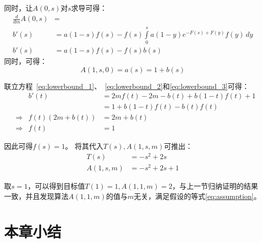 同时，让$A(0, s)$对$s$求导可得：
\begin{align}
    \nonumber \frac{d}{dm}A(0,s) & = \\ 
    \nonumber  b'(s) & = a(1-s)f(s) - f(s)\int\limits_{0}^{s} a{\left(1 - y \right)} e^{- F{\left(s \right)} + F{\left(y \right)}} f(y)\, dy\\
    b'(s) & = a(1-s)f(s) - f(s)b(s) \label{eq:lowerbound_2}
\end{align}
同时，可得：
\begin{equation} \label{eq:lowerbound_3}
    A(1,s,0) = a(s) = 1 + b(s)     
\end{equation}

联立方程~\ref{eq:lowerbound_1}、~\ref{eq:lowerbound_2}和\ref{eq:lowerbound_3}可得：
\begin{align*}
     & & b'(t) & = 2mf(t)-2m-b(t)+b(1-t)f(t) + 1 \\
     & &  & = 1+b(1-t)f(t) - b(t)f(t) \\
    & \Rightarrow & f(t)(2m+b(t)) & = 2m+b(t) \\
    & \Rightarrow & f(t) & = 1
\end{align*}

因此可得$f(s)=1$。
将其代入$T(s), A(1,s,m)$可推出：
\begin{align}
    T(s) & = -s^2 + 2s \\
    A(1, s, m) & = -s^2 + 2s + 1
\end{align}

取$s=1$，可以得到目标值$T(1)=1,A(1,1,m)=2$，与上一节归纳证明的结果一致，并且发现算法$A(1, 1, m)$的值与$m$无关，满足假设的等式\ref{eq:assumption}。
\section{本章小结}